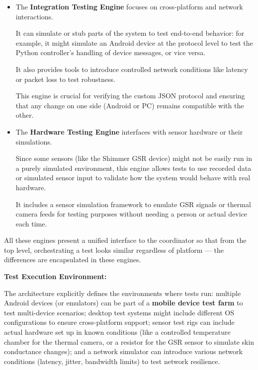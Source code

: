 {{{\begin{itemize}
It provides a rich environment for testing the Python code with fixtures, mocks, and even launching parts of the application in a headless mode.

For example, some tests might start the Python controller in a test mode to simulate a recording session.

The Python engine also supports property-based testing and asynchronous testing (via \texttt{pytest-asyncio}) to handle the asynchronous nature of networking and sensor polling in the system.

\item The \textbf{Integration Testing Engine}
 focuses on cross-platform and network interactions.

It can simulate or stub parts of the system to test end-to-end behavior: for example, it might simulate an Android device at the protocol level to test the Python controller's handling of device messages, or vice versa.

It also provides tools to introduce controlled network conditions like latency or packet loss to test robustness.

This engine is crucial for verifying the custom JSON protocol and ensuring that any change on one side (Android or PC) remains compatible with the other.

\item The \textbf{Hardware Testing Engine}
 interfaces with sensor hardware or their simulations.

Since some sensors (like the Shimmer GSR device) might not be easily run in a purely simulated environment, this engine allows tests to use recorded data or simulated sensor input to validate how the system would behave with real hardware.

It includes a sensor simulation framework to emulate GSR signals or thermal camera feeds for testing purposes without needing a person or actual device each time.

\end{itemize}

All these engines present a unified interface to the coordinator so that from the top level, orchestrating a test looks similar regardless of platform --- the differences are encapsulated in these engines.

\textbf{Test Execution Environment:}

The architecture explicitly defines the environments where tests run: multiple Android devices (or emulators) can be part of a \textbf{mobile device test farm}
 to test multi-device scenarios; desktop test systems might include different OS configurations to ensure cross-platform support; sensor test rigs can include actual hardware set up in known conditions (like a controlled temperature chamber for the thermal camera, or a resistor for the GSR sensor to simulate skin conductance changes); and a network simulator can introduce various network conditions (latency, jitter, bandwidth limits) to test network resilience.

}}}
